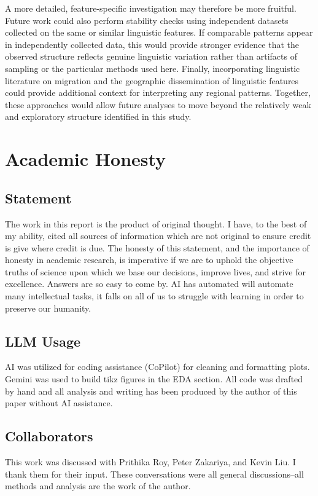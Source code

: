 \documentclass[10pt,letterpaper]{article}
\begin{document}
A more detailed, feature-specific investigation may therefore be more fruitful. Future work could also perform stability checks using independent datasets collected on the same or similar linguistic features. If comparable patterns appear in independently collected data, this would provide stronger evidence that the observed structure reflects genuine linguistic variation rather than artifacts of sampling or the particular methods used here. Finally, incorporating linguistic literature on migration and the geographic dissemination of linguistic features could provide additional context for interpreting any regional patterns. Together, these approaches would allow future analyses to move beyond the relatively weak and exploratory structure identified in this study.




\section{Academic Honesty}\label{academic-integrity-statement}
\subsection{Statement}
The work in this report is the product of original thought. I have, to the best of my ability, cited all sources of information which are not original to ensure credit is give where credit is due. The honesty of this statement, and the importance of honesty in academic research, is imperative if we are to uphold the objective truths of science upon which we base our decisions, improve lives, and strive for excellence. Answers are so easy to come by. AI has automated will automate many intellectual tasks, it falls on all of us to struggle with learning in order to preserve our humanity. 
\subsection{LLM Usage}
AI was utilized for coding assistance (CoPilot) for cleaning and formatting plots. Gemini was used to build tikz figures in the EDA section. All code was drafted by hand and all analysis and writing has been produced by the author of this paper without AI assistance.
\subsection{Collaborators}
This work was discussed with Prithika Roy, Peter Zakariya, and Kevin Liu. I thank them for their input. These conversations were all general discussions--all methods and analysis are the work of the author. 



\printbibliography
\end{document}
